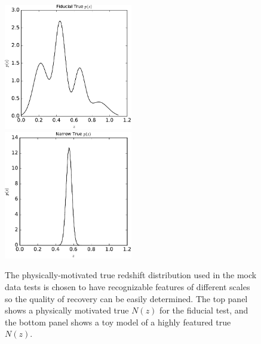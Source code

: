 \documentclass[preprint]{aastex}
\begin{document}
\begin{figure}
\includegraphics[width=0.5\textwidth]{figs/sig5/physPz.pdf}\\
\includegraphics[width=0.5\textwidth]{figs/delt/physPz.pdf}
\caption{The physically-motivated true redshift distribution used in the mock 
data tests is chosen to have recognizable features of different scales so the 
quality of recovery can be easily determined.  The top panel shows a physically 
motivated true $N(z)$ for the fiducial test, and the bottom panel shows a toy 
model of a highly featured true $N(z)$.}
\label{fig:physpz}
\end{figure}
\end{document}
